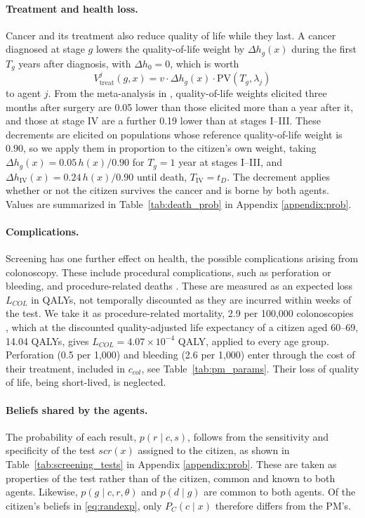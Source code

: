 \documentclass[12pt]{article}
\begin{document}
\paragraph{Treatment and health loss.} Cancer and its treatment also reduce quality of life while they last. A cancer diagnosed at stage $g$ lowers the quality-of-life weight by $\Delta h_g(x)$ during the first $T_g$ years after diagnosis, with $\Delta h_0 = 0$, which is worth
\begin{equation}\label{eq:vtreat}
V^{j}_{\text{treat}}(g, x) = v \cdot \Delta h_g(x) \cdot \mathrm{PV}(T_g,\lambda_j)
\end{equation}
to agent $j$. From the meta-analysis in \citet{djalalov2014review}, quality-of-life weights elicited three months after surgery are 0.05 lower than those elicited more than a year after it, and those at stage IV are a further 0.19 lower than at stages I--III. These decrements are elicited on populations whose reference quality-of-life weight is $0.90$, so we apply them in proportion to the citizen's own weight, taking $\Delta h_g(x) = 0.05\,h(x)/0.90$ for $T_g = 1$ year at stages I--III, and $\Delta h_{\text{IV}}(x) = 0.24\,h(x)/0.90$ until death, $T_{\text{IV}} = t_D$. The decrement applies whether or not the citizen survives the cancer and is borne by both agents. Values are summarized in Table~\ref{tab:death_prob} in Appendix \ref{appendix:prob}.

\paragraph{Complications.} Screening has one further effect on health, the possible complications arising from colonoscopy. These include procedural complications, such as perforation or bleeding, and procedure-related deaths \citep{reumkens2016post, lin2021screening, barre2020cost}. These are measured as an expected loss $L_{COL}$ in QALYs, not temporally discounted as they are incurred within weeks of the test. We take it as procedure-related mortality, 2.9 per 100{,}000 colonoscopies \citep{reumkens2016post}, which at the discounted quality-adjusted life expectancy of a citizen aged 60--69, 14.04 QALYs, gives $L_{COL} = 4.07 \times 10^{-4}$ QALY, applied to every age group. Perforation (0.5 per 1{,}000) and bleeding (2.6 per 1{,}000) enter through the cost of their treatment, included in $c_{col}$, see Table~\ref{tab:pm_params}. Their loss of quality of life, being short-lived, is neglected.

\paragraph{Beliefs shared by the agents.} The probability of each result, $p(r \mid c, s)$, follows from the sensitivity and specificity of the test $scr(x)$ assigned to the citizen, as shown in Table~\ref{tab:screening_tests} in Appendix \ref{appendix:prob}. These are taken as properties of the test rather than of the citizen, common and known to both agents. Likewise, $p(g \mid c, r, \theta)$ and $p(d \mid g)$ are common to both agents. Of the citizen's beliefs in \eqref{eq:randexp}, only $P_C(c \mid x)$ therefore differs from the PM's.
\end{document}
